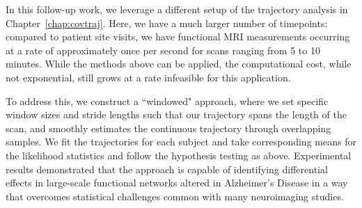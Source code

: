 In this follow-up work,
we leverage a different setup of the trajectory analysis in Chapter~\ref{chap:covtraj}. Here,
we have a much larger number of timepoints:
compared to patient site visits,
we have functional MRI measurements
occurring at a rate of approximately once per second for scans ranging from 5 to 10 minutes.
While the methods above can be applied,
the computational cost, while not exponential,
still grows at a rate infeasible 
for this application.

To address this, we construct a ``windowed" approach, where we set specific window sizes and stride lengths such that our trajectory spans the length of the scan,
and smoothly estimates the continuous trajectory through overlapping samples.
We fit the trajectories for each subject and take corresponding means for the likelihood statistics and follow the hypothesis testing as above.
Experimental results demonstrated that the approach is capable of identifying differential effects in large-scale functional networks altered in Alzheimer's Disease in a way that overcomes statistical challenges common with many neuroimaging studies.

